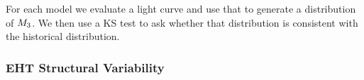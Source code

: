 
For each model we evaluate a light curve and use that to generate a distribution of $M_{3}$.  We then use a KS test to ask whether that distribution is consistent with the historical distribution.

\subsubsection{EHT Structural Variability}



